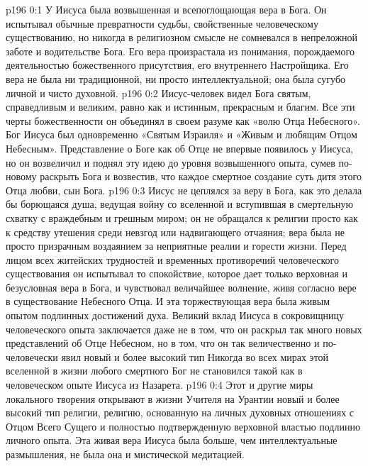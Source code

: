 \author{Комиссия срединников}
\vs p196 0:1 У Иисуса была возвышенная и всепоглощающая вера в Бога. Он испытывал обычные превратности судьбы, свойственные человеческому существованию, но никогда в религиозном смысле не сомневался в непреложной заботе и водительстве Бога. Его вера произрастала из понимания, порождаемого деятельностью божественного присутствия, его внутреннего Настройщика. Его вера не была ни традиционной, ни просто интеллектуальной; она была сугубо личной и чисто духовной.
\vs p196 0:2 Иисус\hyp{}человек видел Бога святым, справедливым и великим, равно как и истинным, прекрасным и благим. Все эти черты божественности он объединял в своем разуме как «волю Отца Небесного». Бог Иисуса был одновременно «Святым Израиля» и «Живым и любящим Отцом Небесным». Представление о Боге как об Отце не впервые появилось у Иисуса, но он возвеличил и поднял эту идею до уровня возвышенного опыта, сумев по\hyp{}новому раскрыть Бога и возвестив, что каждое смертное создание суть дитя этого Отца любви, сын Бога.
\vs p196 0:3 Иисус не цеплялся за веру в Бога, как это делала бы борющаяся душа, ведущая войну со вселенной и вступившая в смертельную схватку с враждебным и грешным миром; он не обращался к религии просто как к средству утешения среди невзгод или надвигающего отчаяния; вера была не просто призрачным воздаянием за неприятные реалии и горести жизни. Перед лицом всех житейских трудностей и временных противоречий человеческого существования он испытывал то спокойствие, которое дает только верховная и безусловная вера в Бога, и чувствовал величайшее волнение, живя согласно вере в существование Небесного Отца. И эта торжествующая вера была живым опытом подлинных достижений духа. Великий вклад Иисуса в сокровищницу человеческого опыта заключается даже не в том, что он раскрыл так много новых представлений об Отце Небесном, но в том, что он так величественно и по\hyp{}человечески явил новый и более высокий тип  Никогда во всех мирах этой вселенной в жизни любого смертного Бог не становился такой  как в человеческом опыте Иисуса из Назарета.
\vs p196 0:4 Этот и другие миры локального творения открывают в жизни Учителя на Урантии новый и более высокий тип религии, религию, основанную на личных духовных отношениях с Отцом Всего Сущего и полностью подтвержденную верховной властью подлинно личного опыта. Эта живая вера Иисуса была больше, чем интеллектуальные размышления, не была она и мистической медитацией.
